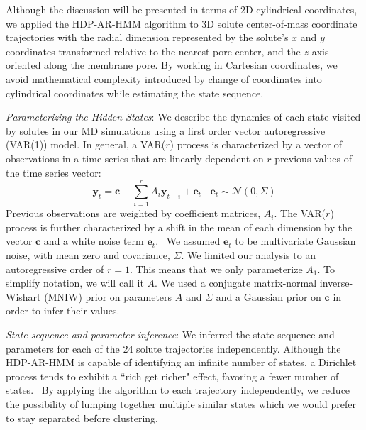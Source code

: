 \documentclass[journal=jpcbfk,manuscript=article]{achemso}
\begin{document}
  Although the discussion will be presented in terms of 2D cylindrical coordinates, we
  applied the HDP-AR-HMM algorithm to 3D solute center-of-mass coordinate trajectories 
  with the radial dimension represented by the solute's $x$ and $y$ coordinates 
  transformed relative to the nearest pore center, and the $z$ axis oriented along 
  the membrane pore. By working in Cartesian coordinates, we avoid mathematical 
  complexity introduced by change of coordinates into cylindrical coordinates while
  estimating the state sequence.
  
  \textit{Parameterizing the Hidden States}: We describe the dynamics of each 
  state visited by solutes in our MD simulations using a first order vector 
  autoregressive (VAR(1)) model. In general, a VAR($r$) process is characterized by a
  vector of observations in a time series that are linearly dependent on $r$ previous
  values of the time series vector:
  \begin{equation}
  	\mathbf{y}_t = \mathbf{c} + \sum_{i=1}^r A_i\mathbf{y}_{t-i} + \mathbf{e}_t~~~~\mathbf{e}_t \sim \mathcal{N}(0, \Sigma)
  \label{eqn:var}
  \end{equation}
  Previous observations are weighted by coefficient matrices, $A_i$. The VAR($r$) 
  process is further characterized by a shift in the mean of each dimension by the
  vector $\mathbf{c}$ and a white noise term $\mathbf{e}_t$.~\cite{hamilton_time_1994}
  We assumed $\mathbf{e}_t$ to be multivariate Gaussian noise, with mean zero and
  covariance, $\Sigma$. We limited our analysis to an autoregressive order of $r=1$.
  This means that we only parameterize $A_1$. To simplify notation, we will call it $A$. 
  We used a conjugate matrix-normal inverse-Wishart (MNIW) prior on parameters 
  $A$ and $\Sigma$ and a Gaussian prior on $\mathbf{c}$ in order to infer their 
  values.~\cite{fox_nonparametric_2009}
   
  
  \textit{State sequence and parameter inference}: We inferred the 
  state sequence and parameters for each of the 24 solute trajectories independently.
  Although the HDP-AR-HMM is capable of identifying an infinite number of states, 
  a Dirichlet process tends to exhibit a ``rich get richer" effect, favoring
  a fewer number of states.~\cite{dreyer_discovering_2011} By applying the algorithm to each trajectory 
  independently, we reduce the possibility of lumping together multiple 
  similar states which we would prefer to stay separated before clustering.
  
\end{document}

